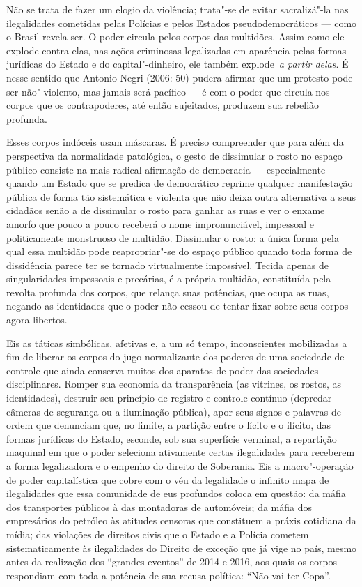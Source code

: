 Não se trata de fazer um elogio da violência; trata"-se de evitar
sacralizá"-la nas ilegalidades cometidas pelas Polícias e pelos Estados
pseudodemocráticos --- como o Brasil revela ser. O poder circula pelos
corpos das multidões. Assim como ele explode contra elas, nas ações
criminosas legalizadas em aparência pelas formas jurídicas do Estado e
do capital"-dinheiro, ele também explode~\emph{a partir delas}. É nesse
sentido que Antonio Negri (2006: 50) pudera afirmar que um protesto
pode ser não"-violento, mas jamais será pacífico --- é com o poder que
circula nos corpos que os contrapoderes, até então sujeitados, produzem
sua rebelião profunda.

Esses corpos indóceis usam máscaras. É preciso compreender que para além
da perspectiva da normalidade patológica, o gesto de dissimular o rosto
no espaço público consiste na mais radical afirmação de democracia ---
especialmente quando um Estado que se predica de democrático reprime
qualquer manifestação pública de forma tão sistemática e violenta que
não deixa outra alternativa a seus cidadãos senão a de dissimular o
rosto para ganhar as ruas e ver o enxame amorfo que pouco a pouco
receberá o nome impronunciável, impessoal e politicamente monstruoso de
multidão. Dissimular o rosto: a única forma pela qual essa multidão pode
reapropriar"-se do espaço público quando toda forma de dissidência parece
ter se tornado virtualmente impossível. Tecida apenas de singularidades
impessoais e precárias, é a própria multidão, constituída pela revolta
profunda dos corpos, que relança suas potências, que ocupa as ruas,
negando as identidades que o poder não cessou de tentar fixar sobre seus
corpos agora libertos.

Eis as táticas simbólicas, afetivas e, a um só tempo, inconscientes
mobilizadas a fim de liberar os corpos do jugo normalizante dos poderes
de uma sociedade de controle que ainda conserva muitos dos aparatos de
poder das sociedades disciplinares. Romper sua economia da transparência
(as vitrines, os rostos, as identidades), destruir seu princípio de
registro e controle contínuo (depredar câmeras de segurança ou a
iluminação pública), apor seus signos e palavras de ordem que denunciam
que, no limite, a partição entre o lícito e o ilícito, das formas
jurídicas do Estado, esconde, sob sua superfície verminal, a repartição
maquinal em que o poder seleciona ativamente certas ilegalidades para
receberem a forma legalizadora e o empenho do direito de Soberania. Eis
a macro"-operação de poder capitalística que cobre com o véu da
legalidade o infinito mapa de ilegalidades que essa comunidade de eus
profundos coloca em questão: da máfia dos transportes públicos à das
montadoras de automóveis; da máfia dos empresários do petróleo às
atitudes censoras que constituem a práxis cotidiana da mídia; das
violações de direitos civis que o Estado e a Polícia cometem
sistematicamente às ilegalidades do Direito de exceção que
já vige no país, mesmo antes da realização dos ``grandes eventos'' de
2014 e 2016, aos quais os corpos respondiam com toda a potência de sua
recusa política: ``Não vai ter Copa''.

